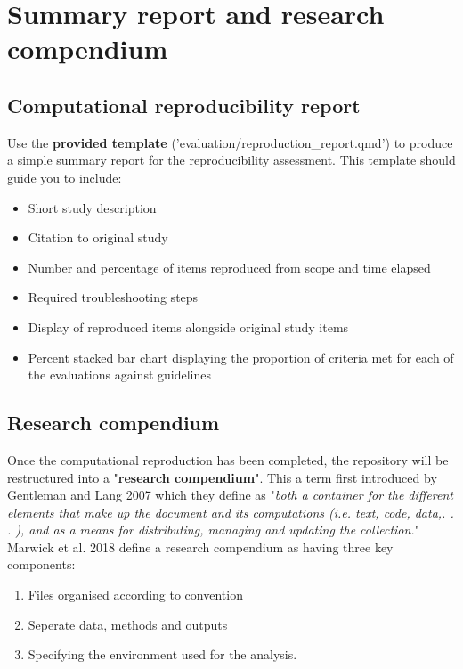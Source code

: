 \section{Summary report and research compendium}

\subsection{Computational reproducibility report} \label{sec:report}

Use the \textbf{provided template} ('evaluation/reproduction\_report.qmd') to produce a simple summary report for the reproducibility assessment. This template should guide you to include:

\begin{itemize}
    \item Short study description
    \item Citation to original study
    \item Number and percentage of items reproduced from scope and time elapsed
    \item Required troubleshooting steps
    \item Display of reproduced items alongside original study items
    \item Percent stacked bar chart displaying the proportion of criteria met for each of the evaluations against guidelines
\end{itemize}

\vspace{1cm}
\subsection{Research compendium} \label{sec:compendium}

Once the computational reproduction has been completed, the repository will be restructured into a "\textbf{research compendium}". This a term first introduced by Gentleman and Lang 2007\autocite{gentleman_statistical_2007} which they define as "\textit{both a container for the different elements that make up the document and its computations (i.e. text, code, data,. . . ), and as a means for distributing, managing and updating the collection.}"\autocite{gentleman_statistical_2007} Marwick et al. 2018 define a research compendium as having three key components:
\begin{enumerate}
    \item Files organised according to convention
    \item Seperate data, methods and outputs
    \item Specifying the environment used for the analysis.\autocite{marwick_packaging_2018}
\end{enumerate}

